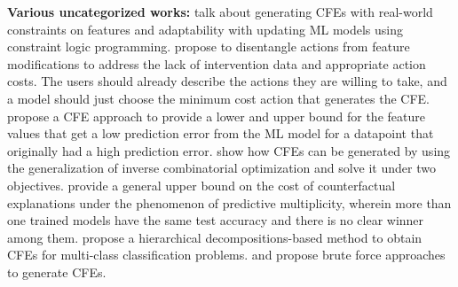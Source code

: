 \textbf{Various uncategorized works: }
\citet{cfe-logic-programming-laurastate} talk about generating CFEs with real-world constraints on features and adaptability with updating ML models using constraint logic programming. 
\citet{action-cfe-tahoun} propose to disentangle actions from feature modifications to address the lack of intervention data and appropriate action costs. The users should already describe the actions they are willing to take, and a model should just choose the minimum cost action that generates the CFE. 
\citet{contrastive-xai-retail-forecast} propose a CFE approach to provide a lower and upper bound for the feature values that get a low prediction error from the ML model for a datapoint that originally had a high prediction error. 
\citet{korikov-cfe-inverse-optimization1, korikov-cfe-inverse-optimization2} show how CFEs can be generated by using the generalization of inverse combinatorial optimization and solve it under two objectives. 
\citet{predictive_multiplicity} provide a general upper bound on the cost of counterfactual explanations under the phenomenon of predictive multiplicity, wherein more than one trained models have the same test accuracy and there is no clear winner among them. 
\citet{cfe-biology-multiclass} propose a hierarchical decompositions-based method to obtain CFEs for multi-class classification problems. 
\citet{declarative-CFE} and \citet{cfe-for-monotone-obj} propose brute force approaches to generate CFEs. 



